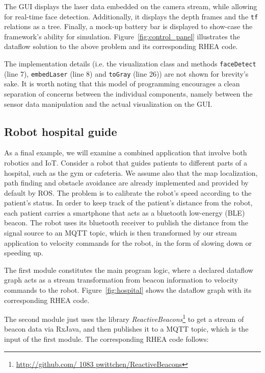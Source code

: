 \documentclass[sigplan,screen,review,anonymous]{acmart}
\begin{document}
The GUI displays the laser data embedded on the camera stream, while allowing
for real-time face detection. Additionally, it displays the depth frames and the
\texttt{tf} relations as a tree. Finally, a mock-up battery bar is displayed to
show-case the framework's ability for simulation. Figure~\ref{fig:control_panel}
illustrates the dataflow solution to the above problem and its corresponding
\textsc{RHEA} code.
%

The implementation details (i.e. the visualization class and methods
\texttt{faceDetect} (line 7), \texttt{embedLaser} (line 8) and
\texttt{toGray} (line 26)) are not shown for brevity's sake. It is worth noting
that this model of programming encourages a clean separation of concerns between the
individual components, namely between the sensor data manipulation and the
actual visualization on the GUI.

\subsection{Robot hospital guide}

As a final example, we will examine a combined application that involve both robotics and IoT.
Consider a robot that guides patients to different parts of a hospital, such as the gym or
cafeteria. We assume also that the map localization, path finding and obstacle
avoidance are already implemented and provided by default by ROS. The problem
is to calibrate the robot's speed according to the patient's status.
%
In order to keep track of the patient's distance from the robot, each patient carries a
smartphone that acts as a bluetooth low-energy (BLE) beacon. The robot uses its
bluetooth receiver to publish the distance from the signal source to an
MQTT topic, which is then transformed by our stream application to velocity
commands for the robot, in the form of slowing down or speeding up.

The first module constitutes the main program logic, where a declared dataflow
graph acts as a stream transformation from beacon information to velocity
commands to the robot. Figure~\ref{fig:hospital} shows the dataflow graph with
its corresponding \textsc{RHEA} code.


The second module just uses the library \textit{ReactiveBeacons}\footnote{\url{http://github.com/ 1083 pwittchen/ReactiveBeacons}}
to get a stream of beacon data via RxJava, and then publishes it to a MQTT topic,
which is the input of the first module. The corresponding \textsc{RHEA} code
follows:
\end{document}
